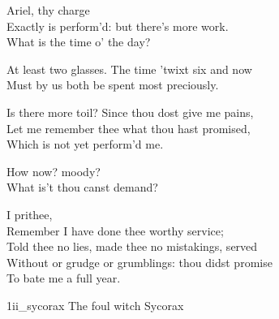 \begin{verse_speech}[Prospero] 
Ariel, thy charge\\
Exactly is perform'd: but there's more work.\\
What is the time o' the day?
\end{verse_speech}


\begin{verse_speech}[Prospero] 
At least two glasses. The time 'twixt six and now\\
Must by us both be spent most preciously.
\end{verse_speech}

\begin{verse_speech}[Ariel] 
Is there more toil? Since thou dost give me pains,\\
Let me remember thee what thou hast promised,\\
Which is not yet perform'd me.
\end{verse_speech}

\begin{verse_speech}[Prospero] 
How now? moody?\\
What is't thou canst demand?
\end{verse_speech}


	
\begin{verse_speech}[Ariel] 
I prithee,\\
Remember I have done thee worthy service;\\
Told thee no lies, made thee no mistakings, served\\
Without or grudge or grumblings: thou didst promise\\
To bate me a full year.
\end{verse_speech}



\begin{pictures} %
	\begin{letter}
		\begin{colorbigpic}
			[1.1]
			{1ii_sycorax}
			{The foul witch Sycorax}
		\end{colorbigpic}
	\end{letter}

\end{pictures}



